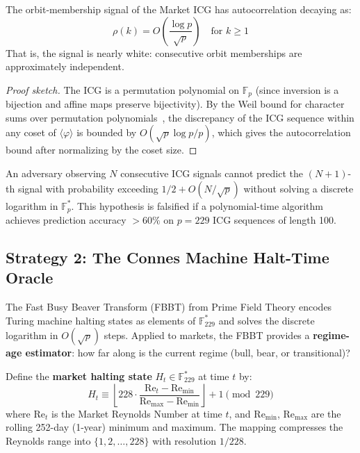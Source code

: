 \begin{proposition}\label{prop:icg_autocorr}
The orbit-membership signal of the Market ICG has autocorrelation decaying as:
$$\rho(k) = O\left(\frac{\log p}{\sqrt{p}}\right) \quad \text{for } k \geq 1$$
That is, the signal is nearly white: consecutive orbit memberships are approximately independent.
\end{proposition}

\begin{proof}[Proof sketch]
The ICG is a permutation polynomial on $\mathbb{F}_p$ (since inversion is a bijection and affine maps preserve bijectivity). By the Weil bound for character sums over permutation polynomials~\cite{weil1948courbes}, the discrepancy of the ICG sequence within any coset of $\langle\varphi\rangle$ is bounded by $O(\sqrt{p}\log p / p)$, which gives the autocorrelation bound after normalizing by the coset size. \qedhere
\end{proof}

\begin{hypothesis}\label{hyp:icg_adversary}
An adversary observing $N$ consecutive ICG signals cannot predict the $(N+1)$-th signal with probability exceeding $1/2 + O(N/\sqrt{p})$ without solving a discrete logarithm in $\mathbb{F}_p^*$. This hypothesis is falsified if a polynomial-time algorithm achieves prediction accuracy $> 60\%$ on $p = 229$ ICG sequences of length 100.
\end{hypothesis}

\subsection{Strategy 2: The Connes Machine Halt-Time Oracle}

The Fast Busy Beaver Transform (FBBT) from Prime Field Theory encodes Turing machine halting states as elements of $\mathbb{F}_{229}^*$ and solves the discrete logarithm in $O(\sqrt{p})$ steps. Applied to markets, the FBBT provides a \textbf{regime-age estimator}: how far along is the current regime (bull, bear, or transitional)?

\begin{definition}\label{def:market_halt}
Define the \textbf{market halting state} $H_t \in \mathbb{F}_{229}^*$ at time $t$ by:
$$H_t \equiv \left\lfloor 228 \cdot \frac{\mathrm{Re}_t - \mathrm{Re}_{\min}}{\mathrm{Re}_{\max} - \mathrm{Re}_{\min}} \right\rfloor + 1 \pmod{229}$$
where $\mathrm{Re}_t$ is the Market Reynolds Number at time $t$, and $\mathrm{Re}_{\min}$, $\mathrm{Re}_{\max}$ are the rolling 252-day (1-year) minimum and maximum. The mapping compresses the Reynolds range into $\{1, 2, \ldots, 228\}$ with resolution $1/228$.
\end{definition}

